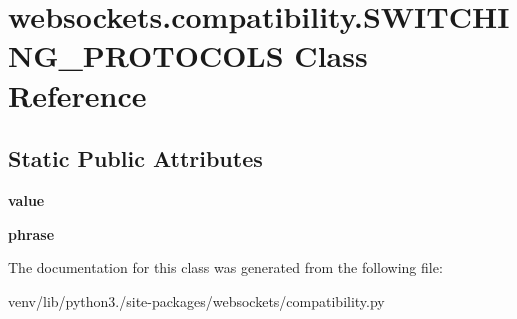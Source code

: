 \hypertarget{classwebsockets_1_1compatibility_1_1_s_w_i_t_c_h_i_n_g___p_r_o_t_o_c_o_l_s}{}\section{websockets.\+compatibility.\+S\+W\+I\+T\+C\+H\+I\+N\+G\+\_\+\+P\+R\+O\+T\+O\+C\+O\+LS Class Reference}
\label{classwebsockets_1_1compatibility_1_1_s_w_i_t_c_h_i_n_g___p_r_o_t_o_c_o_l_s}
\subsection*{Static Public Attributes}
\begin{DoxyCompactItemize}
\item 
\mbox{\label{classwebsockets_1_1compatibility_1_1_s_w_i_t_c_h_i_n_g___p_r_o_t_o_c_o_l_s_af95eeb64aca52ceb819478f1c6eeeb89}} 
{\bfseries value}
\item 
\mbox{\label{classwebsockets_1_1compatibility_1_1_s_w_i_t_c_h_i_n_g___p_r_o_t_o_c_o_l_s_ad7c3a44bf5563a125bc136f5f5830de5}} 
{\bfseries phrase}
\end{DoxyCompactItemize}


The documentation for this class was generated from the following file\+:\begin{DoxyCompactItemize}
\item 
venv/lib/python3./site-\/packages/websockets/compatibility.\+py\end{DoxyCompactItemize}
